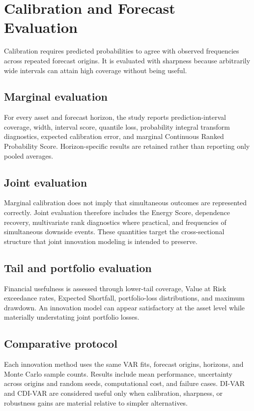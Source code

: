 \documentclass[11pt]{article}
\begin{document}
\section{Calibration and Forecast Evaluation}

Calibration requires predicted probabilities to agree with observed frequencies across repeated forecast origins. It is evaluated with sharpness because arbitrarily wide intervals can attain high coverage without being useful.

\subsection{Marginal evaluation}

For every asset and forecast horizon, the study reports prediction-interval coverage, width, interval score, quantile loss, probability integral transform diagnostics, expected calibration error, and marginal Continuous Ranked Probability Score. Horizon-specific results are retained rather than reporting only pooled averages.

\subsection{Joint evaluation}

Marginal calibration does not imply that simultaneous outcomes are represented correctly. Joint evaluation therefore includes the Energy Score, dependence recovery, multivariate rank diagnostics where practical, and frequencies of simultaneous downside events. These quantities target the cross-sectional structure that joint innovation modeling is intended to preserve.

\subsection{Tail and portfolio evaluation}

Financial usefulness is assessed through lower-tail coverage, Value at Risk exceedance rates, Expected Shortfall, portfolio-loss distributions, and maximum drawdown. An innovation model can appear satisfactory at the asset level while materially understating joint portfolio losses.

\subsection{Comparative protocol}

Each innovation method uses the same VAR fits, forecast origins, horizons, and Monte Carlo sample counts. Results include mean performance, uncertainty across origins and random seeds, computational cost, and failure cases. DI-VAR and CDI-VAR are considered useful only when calibration, sharpness, or robustness gains are material relative to simpler alternatives.
\end{document}
